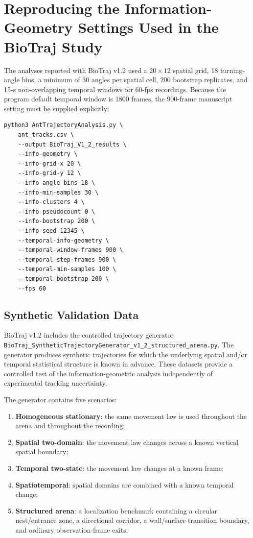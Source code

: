 \documentclass[11pt,a4paper]{article}
\begin{document}
\section{Reproducing the Information-Geometry Settings Used in the BioTraj Study}
The analyses reported with BioTraj v1.2 used a $20\times12$ spatial grid, 18 turning-angle bins, a minimum of 30 angles per spatial cell, 200 bootstrap replicates, and 15-s non-overlapping temporal windows for 60-fps recordings. Because the program default temporal window is 1800 frames, the 900-frame manuscript setting must be supplied explicitly:
\begin{lstlisting}
python3 AntTrajectoryAnalysis.py \
    ant_tracks.csv \
    --output BioTraj_V1_2_results \
    --info-geometry \
    --info-grid-x 20 \
    --info-grid-y 12 \
    --info-angle-bins 18 \
    --info-min-samples 30 \
    --info-clusters 4 \
    --info-pseudocount 0 \
    --info-bootstrap 200 \
    --info-seed 12345 \
    --temporal-info-geometry \
    --temporal-window-frames 900 \
    --temporal-step-frames 900 \
    --temporal-min-samples 100 \
    --temporal-bootstrap 200 \
    --fps 60
\end{lstlisting}

\subsection{Synthetic Validation Data}

BioTraj v1.2 includes the controlled trajectory generator
\texttt{BioTraj\_SyntheticTrajectoryGenerator\_v1\_2\_structured\_arena.py}.
The generator produces synthetic trajectories for which the underlying
spatial and/or temporal statistical structure is known in advance. These
datasets provide a controlled test of the information-geometric analysis
independently of experimental tracking uncertainty.

The generator contains five scenarios:
\begin{enumerate}
\item \textbf{Homogeneous stationary}: the same movement law is used
throughout the arena and throughout the recording;
\item \textbf{Spatial two-domain}: the movement law changes across a known
vertical spatial boundary;
\item \textbf{Temporal two-state}: the movement law changes at a known frame;
\item \textbf{Spatiotemporal}: spatial domains are combined with a known
temporal change;
\item \textbf{Structured arena}: a localization benchmark containing a
circular nest/entrance zone, a directional corridor, a wall/surface-transition
boundary, and ordinary observation-frame exits.
\end{enumerate}
\end{document}
